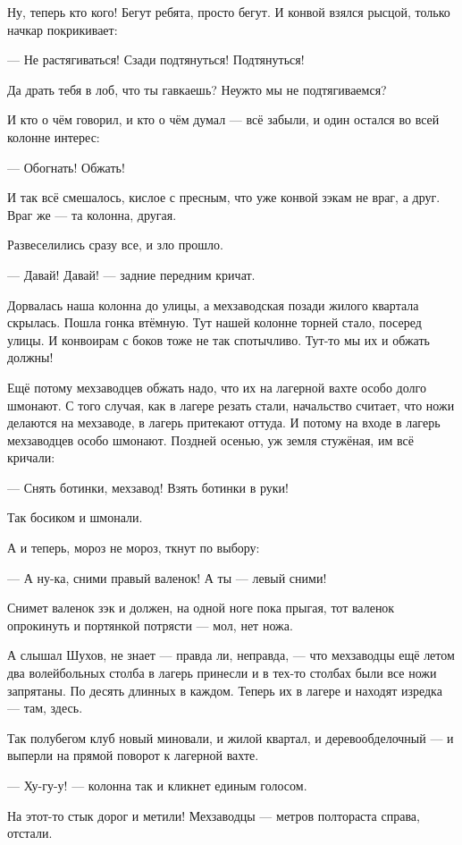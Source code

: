 Ну, теперь кто кого! Бегут ребята, просто бегут. И конвой взялся рысцой, только начкар
покрикивает:

--- Не растягиваться! Сзади подтянуться! Подтянуться!

Да драть тебя в лоб, что ты гавкаешь? Неужто мы не подтягиваемся?

И кто о чём говорил, и кто о чём думал --- всё забыли, и один остался во всей колонне интерес:

--- Обогнать! Обжать!

И так всё смешалось, кислое с пресным, что уже конвой зэкам не враг, а друг. Враг же --- та
колонна, другая.

Развеселились сразу все, и зло прошло.

--- Давай! Давай! --- задние передним кричат.

Дорвалась наша колонна до улицы, а мехзаводская позади жилого квартала скрылась. Пошла
гонка втёмную. Тут нашей колонне торней стало, посеред улицы. И конвоирам с боков тоже не так
спотычливо. Тут-то мы их и обжать должны!

Ещё потому мехзаводцев обжать надо, что их на лагерной вахте особо долго шмонают. С того
случая, как в лагере резать стали, начальство считает, что ножи делаются на мехзаводе, в
лагерь притекают оттуда. И потому на входе в лагерь мехзаводцев особо шмонают. Поздней
осенью, уж земля стужёная, им всё кричали:

--- Снять ботинки, мехзавод! Взять ботинки в руки!

Так босиком и шмонали.

А и теперь, мороз не мороз, ткнут по выбору:

--- А ну-ка, сними правый валенок! А ты --- левый сними!

Снимет валенок зэк и должен, на одной ноге пока прыгая, тот валенок опрокинуть и портянкой
потрясти --- мол, нет ножа.

А слышал Шухов, не знает --- правда ли, неправда, --- что мехзаводцы ещё летом два волейбольных
столба в лагерь принесли и в тех-то столбах были все ножи запрятаны. По десять длинных в
каждом. Теперь их в лагере и находят изредка --- там, здесь.

Так полубегом клуб новый миновали, и жилой квартал, и деревообделочный --- и выперли на прямой
поворот к лагерной вахте.

--- Ху-гу-у! --- колонна так и кликнет единым голосом.

На этот-то стык дорог и метили! Мехзаводцы --- метров полтораста справа, отстали.

